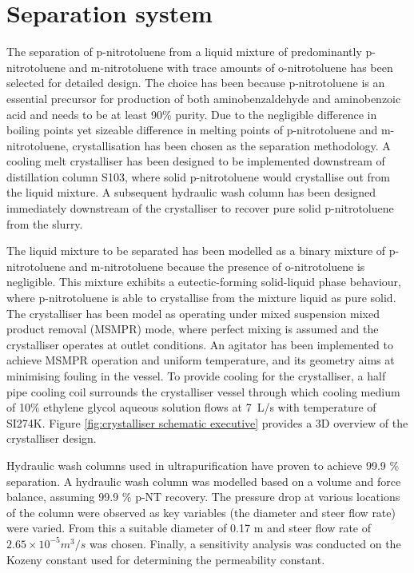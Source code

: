 \section*{Separation system}

The separation of p-nitrotoluene from a liquid mixture of predominantly p-nitrotoluene and m-nitrotoluene with trace amounts of o-nitrotoluene has been selected for detailed design. The choice has been because p-nitrotoluene is an essential precursor for production of both aminobenzaldehyde and aminobenzoic acid and needs to be at least 90\% purity. Due to the negligible difference in boiling points yet sizeable difference in melting points of p-nitrotoluene and m-nitrotoluene, crystallisation has been chosen as the separation methodology. A cooling melt crystalliser has been designed to be implemented downstream of distillation column S103, where solid p-nitrotoluene would crystallise out from the liquid mixture. A subsequent hydraulic wash column has been designed immediately downstream of the crystalliser to recover pure solid p-nitrotoluene from the slurry. 


The liquid mixture to be separated has been modelled as a binary mixture of p-nitrotoluene and m-nitrotoluene because the presence of o-nitrotoluene is negligible. This mixture exhibits a eutectic-forming solid-liquid phase behaviour, where p-nitrotoluene is able to crystallise from the mixture liquid as pure solid. The crystalliser has been model as operating under mixed suspension mixed product removal (MSMPR) mode, where perfect mixing is assumed and the crystalliser operates at outlet conditions. An agitator has been implemented to achieve MSMPR operation and uniform temperature, and its geometry aims at minimising fouling in the vessel. To provide cooling for the crystalliser, a half pipe cooling coil surrounds the crystalliser vessel through which cooling medium of 10\% ethylene glycol aqueous solution flows at \SI{7}{L/s} with temperature of SI{274}{K}. Figure \ref{fig:crystalliser schematic executive} provides a 3D overview of the crystalliser design.


Hydraulic wash columns used in ultrapurification have proven to achieve 99.9 \% separation. A hydraulic wash column was modelled based on a volume and force balance, assuming 99.9 \% p-NT recovery. The pressure drop at various locations of the column were observed as key variables (the diameter and steer flow rate) were varied. From this a suitable diameter of 0.17 m and steer flow rate  of $2.65 \times 10^{-5} m^{3}/s$ was chosen. Finally, a sensitivity analysis was conducted on the Kozeny constant used for determining the permeability constant. 


